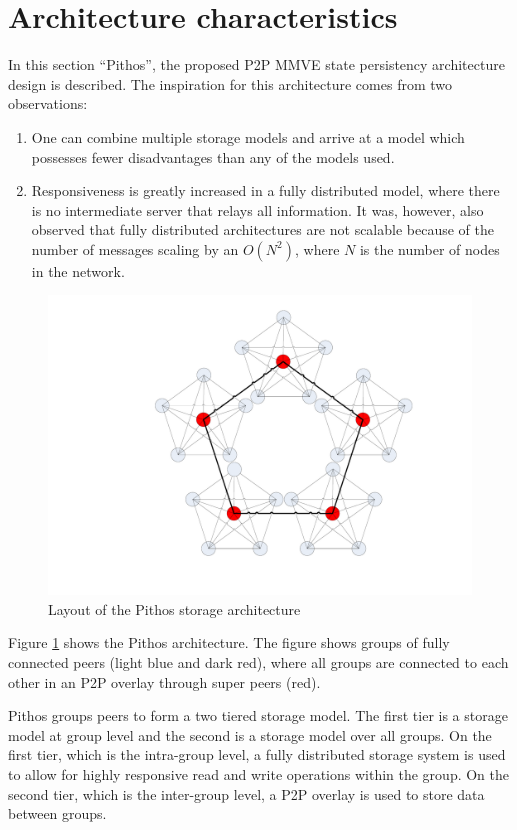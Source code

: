 \documentclass[10pt,a4paper,conference]{IEEEtran}
\begin{document}
\section{Architecture characteristics}
\label{design}

In this section ``Pithos'', the proposed P2P MMVE state persistency architecture design is described. The inspiration for this architecture comes
from two observations:
%
\begin{enumerate}
  \item One can combine multiple storage models and arrive at a model which possesses fewer disadvantages than any of the models used.
  \item Responsiveness is greatly increased in a fully distributed model, where there is no intermediate server that relays all information. It
      was, however, also observed that fully distributed architectures are not scalable because of the number of messages scaling by an $O(N^2)$,
      where $N$ is the number of nodes in the network.
\end{enumerate}

\begin{figure}[htbp]
 \centering
 \includegraphics[clip=true, viewport=7.5cm 2.5cm 26cm 20cm, width=0.7\columnwidth]{CDHT_layout}
 \caption{Layout of the Pithos storage architecture}
 \label{fig_pithos}
\end{figure}
%
Figure \ref{fig_pithos} shows the Pithos architecture. The figure shows groups of fully connected peers (light blue and dark red), where all groups
are connected to each other in an P2P overlay through super peers (red).

Pithos groups peers to form a two tiered storage model. The first tier is a storage model at group level and the second is a storage model over all
groups. On the first tier, which is the intra-group level, a fully distributed storage system is used to allow for highly responsive read and write
operations within the group. On the second tier, which is the inter-group level, a P2P overlay is used to store data between groups.
\end{document}
